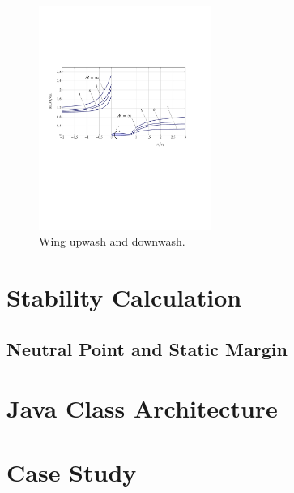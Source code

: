 \begin{figure}[H]
\centering
\includegraphics[height=7.3cm]{Immagini/wing_up-downwash}
\caption{Wing upwash and downwash.}
\label{wingud}
\end{figure}



\section{Stability Calculation}
\subsection{Neutral Point and Static Margin}





\section{Java Class Architecture}

%

 
\section{Case Study}

